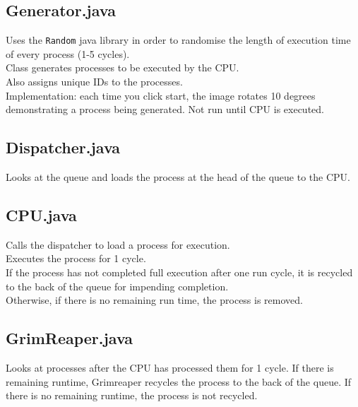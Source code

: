 \documentclass[]{article}
\begin{document}
\vspace{2mm}

\subsection*{Generator.java}
Uses the \verb|Random| java library in order to randomise the length of execution time of every process (1-5 cycles). \\
Class generates processes to be executed by the CPU. \\
Also assigns unique IDs to the processes. \\
Implementation: each time you click start, the image rotates 10 degrees demonstrating a process being generated. Not run until CPU is executed.

\vspace{2mm}

\subsection*{Dispatcher.java}
Looks at the queue and loads the process at the head of the queue to the CPU.

\vspace{2mm}

\subsection*{CPU.java}
Calls the dispatcher to load a process for execution. \\
Executes the process for 1 cycle. \\
If the process has not completed full execution after one run cycle, it is recycled to the back of the queue for impending completion. \\
Otherwise, if there is no remaining run time, the process is removed.

\vspace{2mm}

\subsection*{GrimReaper.java}
Looks at processes after the CPU has processed them for 1 cycle. If there is remaining runtime, Grimreaper recycles the process to the back of the queue. If there is no remaining runtime, the process is not recycled. \\

\vspace{2mm}
\end{document}
